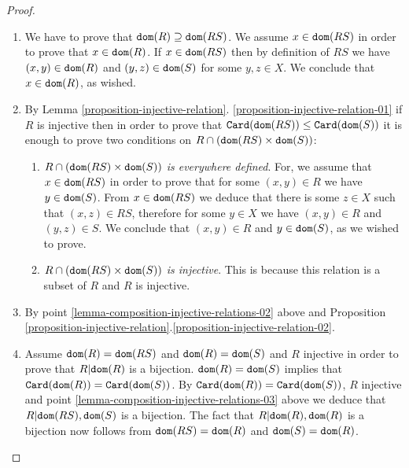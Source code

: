 \documentclass{lmcs}
\begin{document}
\begin{proof}

\begin{enumerate}
\item
We have to prove that ${\tt dom}(R) \supseteq {\tt dom}(RS)$. 
We assume $x \in {\tt dom}(RS)$ in order to prove that $x \in {\tt dom}(R)$.
If  $x \in {\tt dom}(RS)$ then by definition of $RS$ 
we have $(x,y) \in {\tt dom}(R)$ and $(y,z) \in {\tt dom}(S)$ for some $y,z \in X$.
We conclude that $x \in {\tt dom}(R)$, as wished.

\item
By Lemma 
\ref{proposition-injective-relation}.
\ref{proposition-injective-relation-01} 
if $R$ is injective then in order to prove that
${\tt Card}({\tt dom}(RS)) \le {\tt Card}({\tt dom}(S))$ it is enough to prove two conditions
on $R \cap ({\tt dom}(RS) \times {\tt dom}(S))$:

\begin{enumerate}
\item
\emph{$R \cap ({\tt dom}(RS) \times {\tt dom}(S))$ is everywhere defined}.
For, we assume that $x \in {\tt dom}(RS)$ in order to prove that
for some $(x,y) \in R$ we have $y \in {\tt dom}(S)$.
From $x \in {\tt dom}(RS)$ we deduce that there is some $z \in X$ 
such that $(x,z) \in RS$, therefore for some $y \in X$ we have  $(x,y) \in R$ 
and $(y,z) \in S$. We conclude that $(x,y) \in R$ and  
$y \in {\tt dom}(S)$, as we wished to prove.

\item
\emph{$R \cap ({\tt dom}(RS) \times {\tt dom}(S))$ is injective}. This
is  because this relation is a subset of $R$ and $R$ is injective.
\end{enumerate}

\item
By point \ref{lemma-composition-injective-relations-02} above 
and Proposition 
\ref{proposition-injective-relation}.\ref{proposition-injective-relation-02}.

\item
Assume ${\tt dom}(R)={\tt dom}(RS)$ and ${\tt dom}(R)={\tt dom}(S)$ 
and $R$ injective in order to prove that $R{|} {\tt dom}(R)$ is a bijection. 
${\tt dom}(R)={\tt dom}(S)$ implies that ${\tt Card}({\tt dom}(R))={\tt Card}({\tt dom}(S))$.
By ${\tt Card}({\tt dom}(R))={\tt Card}({\tt dom}(S))$, $R$ injective
and point \ref{lemma-composition-injective-relations-03} above we deduce 
that $R{|} {\tt dom}(RS), {\tt dom}(S)$ is a bijection. The fact that
$R{|} {\tt dom}(R), {\tt dom}(R)$ is a bijection now follows from
${\tt dom}(RS) = {\tt dom}(R)$ and ${\tt dom}(S)={\tt dom}(R)$.

\end{enumerate}
\end{proof}
\end{document}
